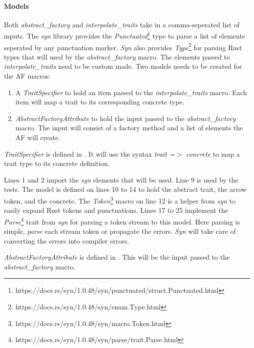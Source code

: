 \paragraph{Models}
Both \textit{abstract\_factory} and \textit{interpolate\_traits} take in a comma-seperated list of inputs.
The \textit{syn} library provides the \textit{Punctuated}\footnote{https://docs.rs/syn/1.0.48/syn/punctuated/struct.Punctuated.html} type to parse a list of elements seperated by any punctuation marker.
\textit{Syn} also provides \textit{Type}\footnote{https://docs.rs/syn/1.0.48/syn/enum.Type.html} for parsing Rust types that will used by the \textit{abstract\_factory} macro.
The elements passed to \textit{interpolate\_traits} need to be custom made.
Two models needs to be created for the AF macros:

\begin{enumerate}
	\item A \textit{TraitSpecifier} to hold an item passed to the \textit{interpolate\_traits} macro.
	      Each item will map a trait to its corresponding concrete type.
	\item \textit{AbstractFactoryAttribute} to hold the input passed to the \textit{abstract\_factory} macro.
	      The input will consist of a factory method and a list of elements the AF will create.
\end{enumerate}

\textit{TraitSpecifier} is defined in .
It will use the syntax \textit{trait =$>$ concrete} to map a trait type to its concrete definition.


Lines 1 and 2 import the \textit{syn} elements that will be used.
Line 9 is used by the tests.
The model is defined on lines 10 to 14 to hold the abstract trait, the arrow token, and the concrete.
The \textit{Token}\footnote{https://docs.rs/syn/1.0.48/syn/macro.Token.html} macro on line 12 is a helper from \textit{syn} to easily expand Rust tokens and punctuations.
Lines 17 to 25 implement the \textit{Parse}\footnote{https://docs.rs/syn/1.0.48/syn/parse/trait.Parse.html} trait from \textit{syn} for parsing a token stream to this model.
Here parsing is simple, \textit{parse} each stream token or propagate the errors.
\textit{Syn} will take care of converting the errors into compiler errors.

\textit{AbstractFactoryAttribute} is defined in .
This will be the input passed to the \textit{abstract\_factory} macro.

